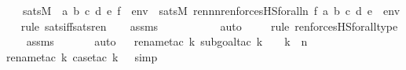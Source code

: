 \begin{isabellebody}
\ \ \ {\isachardoublequoteopen}sats{\isacharparenleft}{\kern0pt}M{\isacharcomma}{\kern0pt}\ {\isasymphi}{\isacharcomma}{\kern0pt}\ {\isacharbrackleft}{\kern0pt}a{\isacharcomma}{\kern0pt}\ b{\isacharcomma}{\kern0pt}\ c{\isacharcomma}{\kern0pt}\ d{\isacharcomma}{\kern0pt}\ e{\isacharcomma}{\kern0pt}\ f{\isacharbrackright}{\kern0pt}\ {\isacharat}{\kern0pt}\ env{\isacharparenright}{\kern0pt}\ {\isasymlongleftrightarrow}\ sats{\isacharparenleft}{\kern0pt}M{\isacharcomma}{\kern0pt}\ ren{\isacharparenleft}{\kern0pt}{\isasymphi}{\isacharparenright}{\kern0pt}{\isacharbackquote}{\kern0pt}{\isacharparenleft}{\kern0pt}{}{\isasymunion}n{\isacharparenright}{\kern0pt}{\isacharbackquote}{\kern0pt}{\isacharparenleft}{\kern0pt}{}{\isasymunion}n{\isacharparenright}{\kern0pt}{\isacharbackquote}{\kern0pt}ren{\isacharunderscore}{\kern0pt}forcesHS{\isacharunderscore}{\kern0pt}forall{\isacharparenleft}{\kern0pt}n{\isacharparenright}{\kern0pt}{\isacharcomma}{\kern0pt}\ {\isacharbrackleft}{\kern0pt}f{\isacharcomma}{\kern0pt}\ a{\isacharcomma}{\kern0pt}\ b{\isacharcomma}{\kern0pt}\ c{\isacharcomma}{\kern0pt}\ d{\isacharcomma}{\kern0pt}\ e{\isacharbrackright}{\kern0pt}\ {\isacharat}{\kern0pt}\ env{\isacharparenright}{\kern0pt}{\isachardoublequoteclose}\isanewline
%
\isadelimproof
\isanewline
\ \ %
\endisadelimproof
%
\isatagproof
{}\isamarkupfalse%
{\isacharparenleft}{\kern0pt}rule\ sats{\isacharunderscore}{\kern0pt}iff{\isacharunderscore}{\kern0pt}sats{\isacharunderscore}{\kern0pt}ren{\isacharparenright}{\kern0pt}\isanewline
\ \ \isamarkupfalse%
\ assms\isanewline
\ \ \ \ \ \ \ \ \ \isamarkupfalse%
\ auto{\isacharbrackleft}{\kern0pt}{}{\isacharbrackright}{\kern0pt}\isanewline
\ \ \ \ \isamarkupfalse%
{\isacharparenleft}{\kern0pt}rule\ ren{\isacharunderscore}{\kern0pt}forcesHS{\isacharunderscore}{\kern0pt}forall{\isacharunderscore}{\kern0pt}type{\isacharparenright}{\kern0pt}\isanewline
\ \ \isamarkupfalse%
\ assms\ \isanewline
\ \ \ \ \isamarkupfalse%
\ auto{\isacharbrackleft}{\kern0pt}{}{\isacharbrackright}{\kern0pt}\isanewline
\ \ \isamarkupfalse%
{\isacharparenleft}{\kern0pt}rename{\isacharunderscore}{\kern0pt}tac\ k{\isacharcomma}{\kern0pt}\ subgoal{\isacharunderscore}{\kern0pt}tac\ {\isachardoublequoteopen}k\ {\isasymin}\ {}\ {\isasymor}\ k\ {\isasymin}\ n{\isachardoublequoteclose}{\isacharparenright}{\kern0pt}\isanewline
\ \ \ \isamarkupfalse%
{\isacharparenleft}{\kern0pt}rename{\isacharunderscore}{\kern0pt}tac\ k{\isacharcomma}{\kern0pt}\ case{\isacharunderscore}{\kern0pt}tac\ {\isachardoublequoteopen}k\ {\isasymin}\ {}{\isachardoublequoteclose}{\isacharcomma}{\kern0pt}\ simp{\isacharparenright}{\kern0pt}\isanewline

\end{isabellebody}

